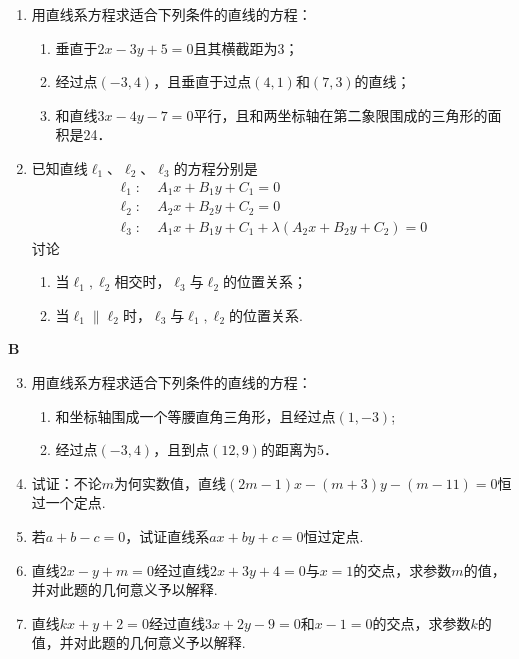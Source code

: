 \begin{enumerate}
\item 用直线系方程求适合下列条件的直线的方程：
\begin{enumerate}[(1)]
    \item 垂直于$2x-3y+5=0$且其横截距为3；
    \item 经过点$(-3,4)$，且垂直于过点$(4,1)$和$(7,3)$的直线；
    \item 和直线$3x-4y-7=0$平行，且和两坐标轴在第二象限围成的三角形的面积是24．
\end{enumerate}

\item 已知直线$\ell_1$、$\ell_2$、$\ell_3$的方程分别是
\[\begin{split}
    \ell_1:&\; A_1x+B_1y+C_1=0\\
    \ell_2:&\; A_2x+B_2y+C_2=0\\
    \ell_3:&\; A_1x+B_1y+C_1+\lambda(A_2x+B_2y+C_2)=0
\end{split}\]
讨论
\begin{enumerate}[(1)]
    \item 当$\ell_1,\ell_2$相交时，$\ell_3$与$\ell_2$的位置关系；
    \item 当$\ell_1\parallel \ell_2$时，$\ell_3$与$\ell_1, \ell_2$的位置关系.
\end{enumerate}

\end{enumerate}

\begin{center}
    \bfseries B
\end{center}

\begin{enumerate}\setcounter{enumi}{2}
 \item 用直线系方程求适合下列条件的直线的方程：
\begin{enumerate}[(1)]
\item 和坐标轴围成一个等腰直角三角形，且经过点$(1,-3)$;
\item 经过点$(-3,4)$，且到点$(12,9)$的距离为5．       
\end{enumerate}
\item 试证：不论$m$为何实数值，直线$(2m-1)x-(m+3)y-(m-11)=0$恒过一个定点.
\item 若$a+b-c=0$，试证直线系$ax+by+c=0$恒过定点.
\item 直线$2x-y+m=0$经过直线$2x+3y+4=0$与$x=1$的交点，求参数$m$的值，并对此题的几何意义予以解释.
\item 直线$kx+y+2=0$经过直线$3x+2y-9=0$和$x-1=0$的交点，求参数$k$的值，并对此题的几何意义予以解释.
\end{enumerate}

